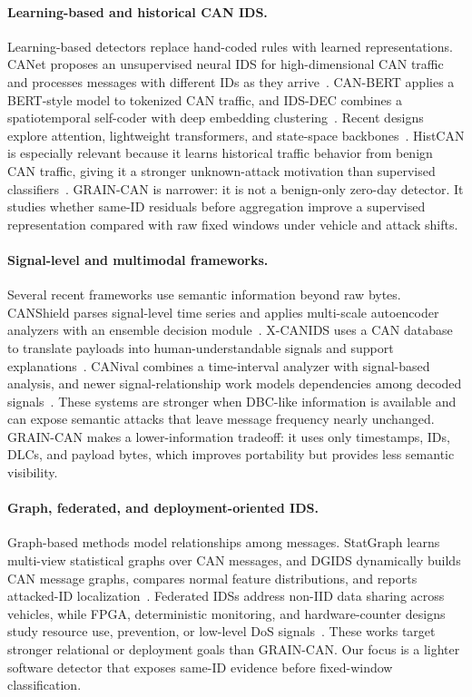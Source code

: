 \documentclass[runningheads]{llncs}
\newcommand{\method}{GRAIN-CAN}
\begin{document}
\paragraph{Learning-based and historical CAN IDS.}
Learning-based detectors replace hand-coded rules with learned representations. CANet proposes an unsupervised neural IDS for high-dimensional CAN traffic and processes messages with different IDs as they arrive~\cite{canet2019}. CAN-BERT applies a BERT-style model to tokenized CAN traffic, and IDS-DEC combines a spatiotemporal self-coder with deep embedding clustering~\cite{alkhatib2022canbert,idsdec2024}. Recent designs explore attention, lightweight transformers, and state-space backbones~\cite{rai2025deepcan,saravanan2025oadl,fedlitecan2025,liu2026mids}. HistCAN is especially relevant because it learns historical traffic behavior from benign CAN traffic, giving it a stronger unknown-attack motivation than supervised classifiers~\cite{zhuo2024histcan}. \method{} is narrower: it is not a benign-only zero-day detector. It studies whether same-ID residuals before aggregation improve a supervised representation compared with raw fixed windows under vehicle and attack shifts.

\paragraph{Signal-level and multimodal frameworks.}
Several recent frameworks use semantic information beyond raw bytes. CANShield parses signal-level time series and applies multi-scale autoencoder analyzers with an ensemble decision module~\cite{shahriar2022canshield}. X-CANIDS uses a CAN database to translate payloads into human-understandable signals and support explanations~\cite{jeong2023xcanids}. CANival combines a time-interval analyzer with signal-based analysis, and newer signal-relationship work models dependencies among decoded signals~\cite{kang2024canival,gao2025signalrelation}. These systems are stronger when DBC-like information is available and can expose semantic attacks that leave message frequency nearly unchanged. \method{} makes a lower-information tradeoff: it uses only timestamps, IDs, DLCs, and payload bytes, which improves portability but provides less semantic visibility.

\paragraph{Graph, federated, and deployment-oriented IDS.}
Graph-based methods model relationships among messages. StatGraph learns multi-view statistical graphs over CAN messages, and DGIDS dynamically builds CAN message graphs, compares normal feature distributions, and reports attacked-ID localization~\cite{wang2023statgraph,song2024dgids}. Federated IDSs address non-IID data sharing across vehicles, while FPGA, deterministic monitoring, and hardware-counter designs study resource use, prevention, or low-level DoS signals~\cite{althunayyan2024federated,khandelwal2024fpga,cantxsec2025,candosa2025}. These works target stronger relational or deployment goals than \method{}. Our focus is a lighter software detector that exposes same-ID evidence before fixed-window classification.
\end{document}
